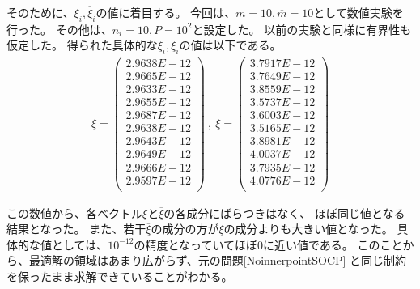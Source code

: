 \documentclass[11pt,a4paper,dvipdfmx,titlepage,uplatex]{jsarticle}
\theoremstyle{mystyle}
\newcommand{\red}[1]{\begin{color}{red}#1\end{color}}
\newcommand{\0}{\mathbf{0}}
\begin{document}
そのために、$\xi_i,\overline{\xi}_i$の値に着目する。
今回は、$m = 10, \overline{m} = 10$として数値実験を行った。
その他は、$n_i = 10 , P = 10^2$と設定した。
以前の実験と同様に有界性も仮定した。
得られた具体的な$\xi_i,\overline{\xi}_i$の値は以下である。
\begin{align}
  \xi =
  \begin{pmatrix}
    2.9638E-12 \\
    2.9665E-12 \\
    2.9633E-12 \\
    2.9655E-12 \\
    2.9687E-12 \\
    2.9638E-12 \\
    2.9643E-12 \\
    2.9649E-12 \\
    2.9666E-12 \\
    2.9597E-12 \\
  \end{pmatrix}
  \ , \ \overline{\xi} =
  \begin{pmatrix}
    3.7917E-12 \\
    3.7649E-12 \\
    3.8559E-12 \\
    3.5737E-12 \\
    3.6003E-12 \\
    3.5165E-12 \\
    3.8981E-12 \\
    4.0037E-12 \\
    3.7935E-12 \\
    4.0776E-12 \\
  \end{pmatrix}
\end{align}

この数値から、各ベクトル$\xi$と$\overline{\xi}$の各成分にばらつきはなく、
ほぼ同じ値となる結果となった。
また、若干$\overline{\xi}$の成分の方が$\xi$の成分よりも大きい値となった。
具体的な値としては、$10^{-12}$の精度となっていてほぼ0に近い値である。
このことから、最適解の領域はあまり広がらず、元の問題\eqref{NoinnerpointSOCP}
と同じ制約を保ったまま求解できていることがわかる。

\end{document}
